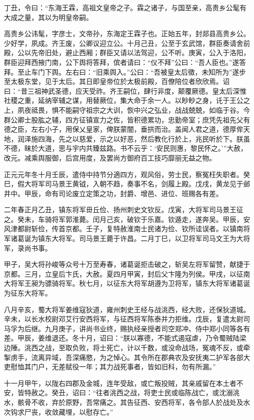 \documentclass[12pt,UTF8]{ctexbook}
\begin{document}
丁丑，令曰：“东海王霖，高祖文皇帝之子。霖之诸子，与国至亲，高贵乡公髦有大成之量，其以为明皇帝嗣。

高贵乡公讳髦，字彦士，文帝孙，东海定王霖子也。正始五年，封郯县高贵乡公。少好学，夙成。齐王废，公卿议迎立公。十月己丑，公至于玄武馆，群臣奏请舍前殿，公以先帝旧处，避止西厢；群臣又请以法驾迎，公不听。庚寅，公入于洛阳，群臣迎拜西掖门南，公下舆将答拜，傧者请曰：“仪不拜”公曰：“吾人臣也。”遂答拜。至止车门下舆。左右曰：“旧乘舆入。”公曰：“吾被皇太后徵，未知所为”遂步至太极东堂，见于太后。其日即皇帝位於太极前殿，百僚陪位者欣欣焉。诏曰：“昔三祖神武圣德，应天受祚。齐王嗣位，肆行非度，颠覆厥德。皇太后深惟社稷之重，延纳宰辅之谋，用替厥位，集大命于余一人。以眇眇之身，讬于王公之上，夙夜祗畏，惧不能嗣守祖宗之大训，恢中兴之弘业，战战兢兢，如临于谷。今群公卿士股肱之辅，四方征镇宣力之佐，皆积德累功，忠勤帝室；庶凭先祖先父有德之臣，左右小子，用保乂皇家，俾朕蒙闇，垂拱而治。盖闻人君之道，德厚侔天地，润泽施四海，先之以慈爱，示之以好恶，然后教化行於上，兆民听於下。朕虽不德，昧於大道，思与宇内共臻兹路。书不云乎：‘安民则惠，黎民怀之。’”大赦，改元。减乘舆服御，后宫用度，及罢尚方御府百工技巧靡丽无益之物。

正元元年冬十月壬辰，遣侍中持节分適四方，观风俗，劳士民，察冤枉失职者。癸巳，假大将军司马景王黄钺，入朝不趋，奏事不名，剑履上殿。戊戌，黄龙见于邺井中。甲辰，命有司论废立定策之功，封爵、增邑、进位、班赐各有差。

二年春正月乙丑，镇东将军毌丘俭、扬州刺史文钦反。戊寅，大将军司马景王征之。癸未，车骑将军郭淮薨。闰月己亥，破钦于乐嘉。钦遁走，遂奔吴。甲辰，安风津都尉斩俭，传首京都。壬子，复特赦淮南士民诸为俭、钦所诖误者。以镇南将军诸葛诞为镇东大将军。司马景王薨于许昌。二月丁巳，以卫将军司马文王为大将军，录尚书事。

甲子，吴大将孙峻等众号十万至寿春，诸葛诞拒击破之，斩吴左将军留赞，献捷于京都。三月，立皇后卞氏，大赦。夏四月甲寅，封后父卞隆为列侯。甲戌，以征南大将军王昶为骠骑将军。秋七月，以征东大将军胡遵为卫将军，镇东大将军诸葛诞为征东大将军。

八月辛亥，蜀大将军姜维寇狄道，雍州刺史王经与战洮西，经大败，还保狄道城。辛未，以长水校尉邓艾行安西将军，与征西将军陈泰并力拒维。戊辰，复遣太尉司马孚为后继。九月庚子，讲尚书业终，赐执经亲授者司空郑冲、侍中郑小同等各有差。甲辰，姜维退还。冬十月，诏曰：“朕以寡德，不能式遏寇虐，乃令蜀贼陆梁边陲。洮西之战，至取负败，将士死亡，计以千数，或没命战场，冤魂不反，或牵掣虏手，流离异域，吾深痛愍，为之悼心。其令所在郡典农及安抚夷二护军各部大吏慰恤其门户，无差赋役一年；其力战死事者，皆如旧科，勿有所漏。”

十一月甲午，以陇右四郡及金城，连年受敌，或亡叛投贼，其亲戚留在本土者不安，皆特赦之。癸丑，诏曰：“往者洮西之战，将吏士民或临陈战亡，或沈溺洮水，骸骨不收，弃於原野，吾常痛之。其告征西、安西将军，各令部人於战处及水次钩求尸丧，收敛藏埋，以慰存亡。”
\end{document}
